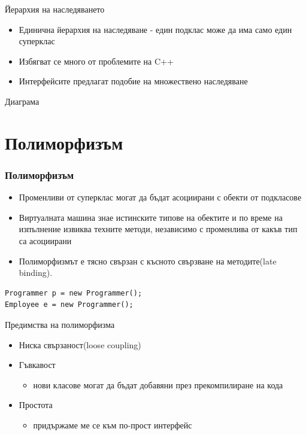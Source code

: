 \documentclass{beamer}
\begin{document}
\begin{frame}{Йерархия на наследяването}
  \transdissolve
  \begin{itemize}
  \item Единична йерархия на наследяване - един подклас може да има
    само един суперклас
  \item Избягват се много от проблемите на C++
  \item Интерфейсите предлагат подобие на множествено наследяване
  \end{itemize}
\end{frame}

\begin{frame}{Диаграма}
  \transdissolve
\end{frame}

\section{Полиморфизъм}

\begin{frame}[fragile]
  \frametitle{Полиморфизъм}
  \transdissolve
  \begin{itemize}
    \item Променливи от суперклас могат да бъдат асоциирани с обекти
      от подкласове
    \item Виртуалната машина знае истинските типове на обектите и по
      време на изпълнение извиква техните методи, независимо с
      променлива от какъв тип са асоциирани
    \item Полиморфизмът е тясно свързан с късното свързване на
    методите(late binding).
  \end{itemize}
  \begin{lstlisting}
Programmer p = new Programmer();
Employee e = new Programmer();
  \end{lstlisting}
\end{frame}

\begin{frame}{Предимства на полиморфизма}
  \transdissolve
  \begin{itemize}
  \item Ниска свързаност(loose coupling)
  \item Гъвкавост
    \begin{itemize}
    \item нови класове могат да бъдат добавяни през
      прекомпилиране на кода
    \end{itemize}
  \item Простота
    \begin{itemize}
    \item придържаме ме се към по-прост интерфейс
    \end{itemize}
  \end{itemize}
\end{frame}
\end{document}
